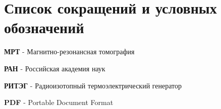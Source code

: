\chapter*{Список сокращений и условных обозначений}             %

\textbf{МРТ} - Магнитно-резонансная томография

\textbf{РАН} - Российская академия наук

\textbf{РИТЭГ} - Радиоизотопный термоэлектрический генератор

\textbf{PDF} - Portable Document Format
